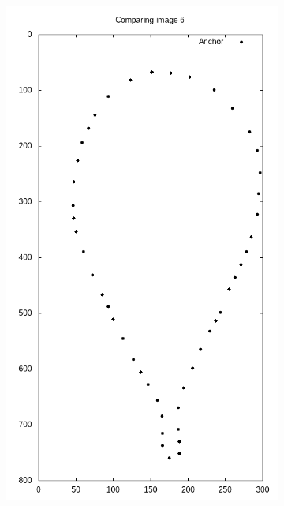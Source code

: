 \begin{frame}
\begin{figure}[ht!]
\begin{subfigure}[b]{0.19\textwidth}
	\end{subfigure}
	\begin{subfigure}[b]{0.19\textwidth}
		\centering
		\includegraphics[width=\textwidth]{img/points.png}
	\end{subfigure}
	\begin{subfigure}[b]{0.19\textwidth}
		\centering

\end{subfigure}
\end{figure}
\end{frame}
